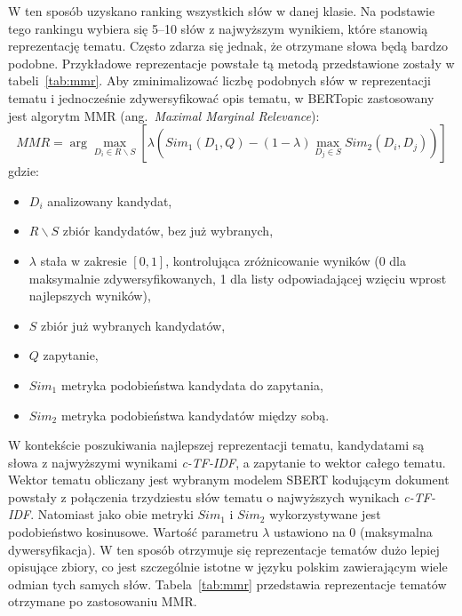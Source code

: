 	W ten sposób uzyskano ranking wszystkich słów w danej klasie.
	Na podstawie tego rankingu wybiera się 5--10 słów z najwyższym wynikiem, które stanowią reprezentację tematu.
	Często zdarza się jednak, że otrzymane słowa będą bardzo podobne.
	Przykładowe reprezentacje powstałe tą metodą przedstawione zostały w tabeli~\ref{tab:mmr}.
	Aby zminimalizować liczbę podobnych słów w reprezentacji tematu i jednocześnie zdywersyfikować opis tematu,
		w BERTopic zastosowany jest algorytm MMR (ang.\ \emph{Maximal Marginal Relevance})\cite{MMR}:
	\[MMR = \arg \max_{D_i \in R\backslash S} \left[\lambda\left(Sim_1(D_1, Q) - (1-\lambda) \max_{D_j \in S} Sim_2(D_i, D_j)\right)\right]\]
	gdzie:
	\begin{itemize}
		\item \(D_i\) analizowany kandydat,
		\item \(R\backslash S\) zbiór kandydatów, bez już wybranych,
		\item \(\lambda\) stała w zakresie \(\left[0,1\right]\), kontrolująca zróżnicowanie wyników (0 dla maksymalnie zdywersyfikowanych, 1 dla listy odpowiadającej wzięciu wprost najlepszych wyników),
		\item \(S\) zbiór już wybranych kandydatów,
		\item \(Q\) zapytanie,
		\item \(Sim_1\) metryka podobieństwa kandydata do zapytania,
		\item \(Sim_2\) metryka podobieństwa kandydatów między sobą.
	\end{itemize}
	W kontekście poszukiwania najlepszej reprezentacji tematu, kandydatami są słowa z najwyższymi wynikami \emph{c-TF-IDF}, a zapytanie to wektor całego tematu.
	Wektor tematu obliczany jest wybranym modelem SBERT kodującym dokument powstały z połączenia trzydziestu słów tematu o najwyższych wynikach \emph{c-TF-IDF}.
	Natomiast jako obie metryki \(Sim_1\) i \(Sim_2\) wykorzystywane jest podobieństwo kosinusowe.
	Wartość parametru \(\lambda\) ustawiono na 0 (maksymalna dywersyfikacja).
	W ten sposób otrzymuje się reprezentacje tematów dużo lepiej opisujące zbiory,
		co jest szczególnie istotne w języku polskim zawierającym wiele odmian tych samych słów.
	Tabela~\ref{tab:mmr} przedstawia reprezentacje tematów otrzymane po zastosowaniu MMR\@.

